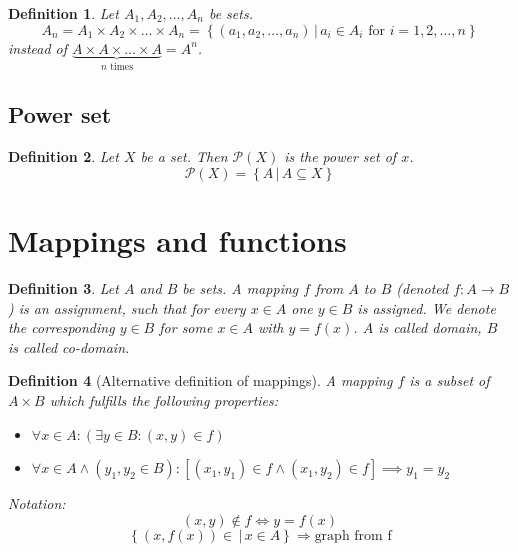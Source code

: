 \documentclass[a4paper,landscape,twocolumn]{article}
\newtheorem{defi}{Definition}
\newcommand\setdef[2]{\left\{#1\,|\,#2\right\}}
\begin{document}
\begin{defi}
  Let $A_1, A_2, \dots, A_n$ be sets.
  \[ A_n = A_1 \times A_2 \times \dots \times A_n = \setdef{(a_1, a_2, \dots, a_n)}{a_i \in A_i \text{ for } i = 1, 2, \dots, n} \]
  instead of $\underbrace{A \times A \times \dots \times A}_{n \text{ times}} = A^n$.
\end{defi}

\subsection{Power set}
\begin{defi}
  Let $X$ be a set. Then $\mathcal P(X)$ is the \emph{power set} of $x$.
  \[ \mathcal P(X) = \setdef{A}{A \subseteq X} \]
\end{defi}

\section{Mappings and functions}
\begin{defi}
  Let $A$ and $B$ be sets.
  A \emph{mapping} $f$ from $A$ to $B$ (denoted $f: A \rightarrow B$) is an assignment,
  such that for every $x \in A$ one $y \in B$ is assigned. We denote the corresponding
  $y \in B$ for some $x \in A$ with $y = f(x)$.
  $A$ is called \emph{domain}, $B$ is called \emph{co-domain}.
\end{defi}

\begin{defi}[Alternative definition of mappings]
  A mapping $f$ is a subset of $A \times B$ which fulfills the following properties:
  \begin{itemize}
    \item $\forall x \in A: \left(\exists y \in B: (x, y) \in f\right)$
    \item $\forall x \in A \land (y_1, y_2 \in B): \left[(x_1,y_1) \in f \land (x_1, y_2) \in f\right] \implies y_1 = y_2$
  \end{itemize}
  Notation:
  \[ (x, y) \not\in f \Leftrightarrow y = f(x) \]
  \[ \setdef{(x, f(x)) \in}{x \in A} \Rightarrow \text{graph from f} \]
\end{defi}
\end{document}
